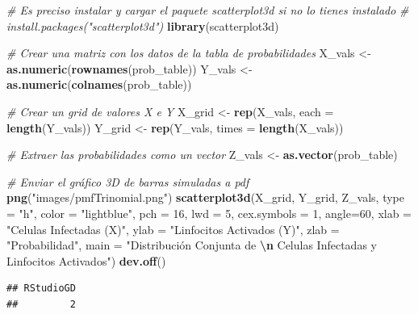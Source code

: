 \documentclass[
]{article}
\newenvironment{Shaded}{\begin{snugshade}}{\end{snugshade}}
\newcommand{\AttributeTok}[1]{\textcolor[rgb]{0.13,0.29,0.53}{#1}}
\newcommand{\CommentTok}[1]{\textcolor[rgb]{0.56,0.35,0.01}{\textit{#1}}}
\newcommand{\DecValTok}[1]{\textcolor[rgb]{0.00,0.00,0.81}{#1}}
\newcommand{\FunctionTok}[1]{\textcolor[rgb]{0.13,0.29,0.53}{\textbf{#1}}}
\newcommand{\NormalTok}[1]{#1}
\newcommand{\OtherTok}[1]{\textcolor[rgb]{0.56,0.35,0.01}{#1}}
\newcommand{\SpecialCharTok}[1]{\textcolor[rgb]{0.81,0.36,0.00}{\textbf{#1}}}
\newcommand{\StringTok}[1]{\textcolor[rgb]{0.31,0.60,0.02}{#1}}
\begin{document}
\begin{Shaded}
\begin{Highlighting}[]
\CommentTok{\# Es preciso instalar y cargar el paquete scatterplot3d si no lo tienes instalado}
\CommentTok{\# install.packages("scatterplot3d")}
\FunctionTok{library}\NormalTok{(scatterplot3d)}

\CommentTok{\# Crear una matriz con los datos de la tabla de probabilidades}
\NormalTok{X\_vals }\OtherTok{\textless{}{-}} \FunctionTok{as.numeric}\NormalTok{(}\FunctionTok{rownames}\NormalTok{(prob\_table))}
\NormalTok{Y\_vals }\OtherTok{\textless{}{-}} \FunctionTok{as.numeric}\NormalTok{(}\FunctionTok{colnames}\NormalTok{(prob\_table))}

\CommentTok{\# Crear un grid de valores X e Y}
\NormalTok{X\_grid }\OtherTok{\textless{}{-}} \FunctionTok{rep}\NormalTok{(X\_vals, }\AttributeTok{each =} \FunctionTok{length}\NormalTok{(Y\_vals))}
\NormalTok{Y\_grid }\OtherTok{\textless{}{-}} \FunctionTok{rep}\NormalTok{(Y\_vals, }\AttributeTok{times =} \FunctionTok{length}\NormalTok{(X\_vals))}

\CommentTok{\# Extraer las probabilidades como un vector}
\NormalTok{Z\_vals }\OtherTok{\textless{}{-}} \FunctionTok{as.vector}\NormalTok{(prob\_table)}

\CommentTok{\# Enviar el gráfico 3D de barras simuladas a pdf}
\FunctionTok{png}\NormalTok{(}\StringTok{"images/pmfTrinomial.png"}\NormalTok{)}
\FunctionTok{scatterplot3d}\NormalTok{(X\_grid, Y\_grid, Z\_vals,}
                     \AttributeTok{type =} \StringTok{"h"}\NormalTok{, }\AttributeTok{color =} \StringTok{"lightblue"}\NormalTok{, }
                     \AttributeTok{pch =} \DecValTok{16}\NormalTok{, }\AttributeTok{lwd =} \DecValTok{5}\NormalTok{, }
                     \AttributeTok{cex.symbols =} \DecValTok{1}\NormalTok{,}
                     \AttributeTok{angle=}\DecValTok{60}\NormalTok{,}
                     \AttributeTok{xlab =} \StringTok{"Celulas Infectadas (X)"}\NormalTok{, }
                     \AttributeTok{ylab =} \StringTok{"Linfocitos Activados (Y)"}\NormalTok{, }
                     \AttributeTok{zlab =} \StringTok{"Probabilidad"}\NormalTok{,}
                     \AttributeTok{main =} \StringTok{"Distribución Conjunta de }\SpecialCharTok{\textbackslash{}n}\StringTok{ Celulas Infectadas y Linfocitos Activados"}\NormalTok{)}
\FunctionTok{dev.off}\NormalTok{()}
\end{Highlighting}
\end{Shaded}

\begin{verbatim}
## RStudioGD 
##         2
\end{verbatim}
\end{document}
